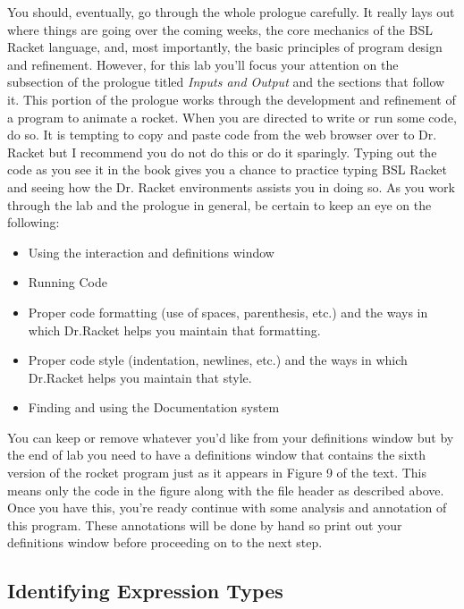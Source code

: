 \documentclass[nobib]{tufte-handout}
\begin{document}
You should, eventually, go through the whole prologue carefully. It really lays out where things are going over the coming weeks, the core mechanics of the BSL Racket language, and, most importantly, the basic principles of program design and refinement. However, for this lab you'll focus your attention on the subsection of the prologue titled \textit{Inputs and Output} and the sections that follow it. This portion of the prologue works through the development and refinement of a program to animate a rocket.  When you are directed to write or run some code, do so. It is tempting to copy and paste code from the web browser over to Dr. Racket but I recommend you do not do this or do it sparingly.  Typing out the code as you see it in the book gives you a chance to practice typing BSL Racket and seeing how the Dr. Racket environments assists you in doing so. As you work through the lab and the prologue in general, be certain to keep an eye on the following:
\begin{itemize}
  \item Using the interaction and definitions window
  \item Running Code
  \item Proper code formatting (use of spaces, parenthesis, etc.) and the ways in which Dr.Racket helps you maintain that formatting.
  \item Proper code style (indentation, newlines, etc.) and the ways in which Dr.Racket helps you maintain that style.
  \item Finding and using the Documentation system
\end{itemize}

You can keep or remove whatever you'd like from your definitions window but by the end of lab you need to have a definitions window that contains the sixth version of the rocket program just as it appears in Figure 9 of the text.  This means only the code in the figure along with the file header as described above. Once you have this, you're ready continue with some analysis and annotation of this program. These annotations will be done by hand so print out your definitions window before proceeding on to the next step.

\subsection{Identifying Expression Types}
\end{document}
